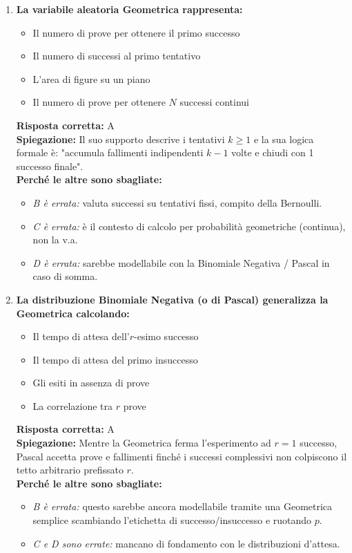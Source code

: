 \documentclass[12pt, a4paper]{article}
\begin{document}
\begin{enumerate}[label=\textbf{\arabic*.}]
    \item \textbf{La variabile aleatoria Geometrica rappresenta:}
    \begin{itemize}
        \item[A)] Il numero di prove per ottenere il primo successo
        \item[B)] Il numero di successi al primo tentativo
        \item[C)] L'area di figure su un piano
        \item[D)] Il numero di prove per ottenere $N$ successi continui
    \end{itemize}
    \textbf{Risposta corretta:} A \\
    \textbf{Spiegazione:} Il suo supporto descrive i tentativi $k \ge 1$ e la sua logica formale è: "accumula fallimenti indipendenti $k-1$ volte e chiudi con 1 successo finale". \\
    \textbf{Perché le altre sono sbagliate:}
    \begin{itemize}
        \item \textit{B è errata:} valuta successi su tentativi fissi, compito della Bernoulli.
        \item \textit{C è errata:} è il contesto di calcolo per probabilità geometriche (continua), non la v.a.
        \item \textit{D è errata:} sarebbe modellabile con la Binomiale Negativa / Pascal in caso di somma.
    \end{itemize}

    \item \textbf{La distribuzione Binomiale Negativa (o di Pascal) generalizza la Geometrica calcolando:}
    \begin{itemize}
        \item[A)] Il tempo di attesa dell'$r$-esimo successo
        \item[B)] Il tempo di attesa del primo insuccesso
        \item[C)] Gli esiti in assenza di prove
        \item[D)] La correlazione tra $r$ prove
    \end{itemize}
    \textbf{Risposta corretta:} A \\
    \textbf{Spiegazione:} Mentre la Geometrica ferma l'esperimento ad $r=1$ successo, Pascal accetta prove e fallimenti finché i successi complessivi non colpiscono il tetto arbitrario prefissato $r$. \\
    \textbf{Perché le altre sono sbagliate:}
    \begin{itemize}
        \item \textit{B è errata:} questo sarebbe ancora modellabile tramite una Geometrica semplice scambiando l'etichetta di successo/insuccesso e ruotando $p$.
        \item \textit{C e D sono errate:} mancano di fondamento con le distribuzioni d'attesa.
    \end{itemize}


\end{enumerate}
\end{document}
